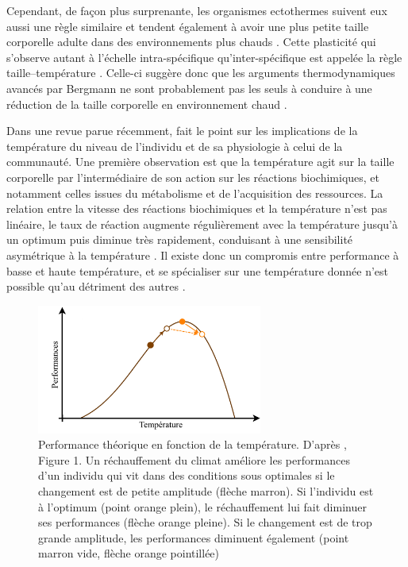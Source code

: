 Cependant, de façon plus surprenante, les organismes ectothermes suivent eux
aussi une règle similaire et tendent également à avoir une plus petite taille
corporelle adulte dans des environnements plus chauds
\autocites{angilletta2009a,ohlberger2013a}.
Cette plasticité qui s'observe autant à l'échelle intra-spécifique
qu'inter-spécifique est appelée la règle taille--température
\autocites[``\textbf{temperature--size rule}''][]{atkinson1994a}. Celle-ci
suggère donc que les arguments thermodynamiques avancés par Bergmann ne sont probablement pas les seuls à conduire à une réduction de la taille corporelle en environnement chaud
\autocite{edeline2013a}.

Dans une revue parue récemment, \textcite{ohlberger2013a} fait le point sur les
implications de la température du niveau de l'individu et de sa physiologie à
celui de la communauté. Une première observation est que la température agit sur
la taille corporelle par l'intermédiaire de son action sur les réactions
biochimiques, et notamment celles issues du métabolisme et de l'acquisition des
ressources. La relation entre la vitesse des réactions biochimiques et la
température n'est pas linéaire, le taux de réaction augmente régulièrement avec
la température jusqu'à un optimum puis diminue très rapidement, conduisant à une
sensibilité asymétrique à la température \autocites{hochachka2002a,
angilletta2009a}. Il existe donc un compromis entre performance à basse et haute
température, et se spécialiser sur une température donnée n'est possible qu'au
détriment des autres \autocites{angilletta2009a}.

\begin{figure}[!ht] %
\centering
\includegraphics[width=0.66\textwidth]{1_CorpsDeThese/EA/Fig/ThermalCurve.pdf}
\caption[
Performance théorique en fonction de la température]{Performance théorique en
fonction de la température. D'après \textcites{ohlberger2013a}, Figure 1. Un
réchauffement du climat améliore les performances d'un individu qui vit dans
des conditions sous optimales si le changement est de petite amplitude (flèche
marron). Si l'individu est à l'optimum (point orange plein), le réchauffement
lui fait diminuer ses performances (flèche orange pleine). Si le changement est
de trop grande amplitude, les performances diminuent également (point marron
vide, flèche orange pointillée)}
\label{Fig:EA1}
\end{figure}


